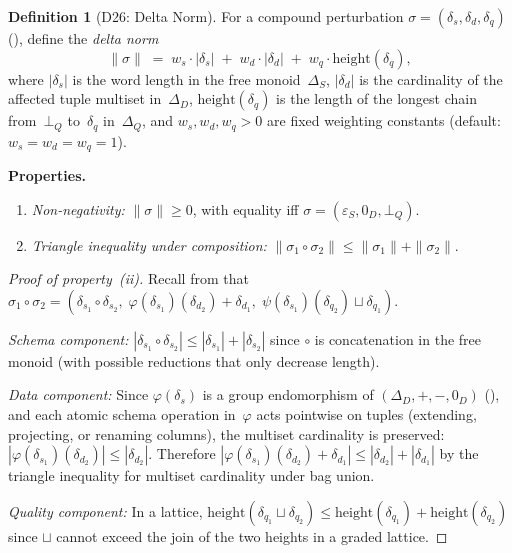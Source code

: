 \documentclass[11pt,a4paper]{article}
\theoremstyle{definition}
\newtheorem{definition}[theorem]{Definition}
\newcommand{\DeltaS}{\Delta_{\!S}}
\newcommand{\DeltaD}{\Delta_{\!D}}
\newcommand{\DeltaQ}{\Delta_{\!Q}}
\newcommand{\epsS}{\varepsilon_S}
\newcommand{\zeroD}{0_D}
\newcommand{\botQ}{\bot_Q}
\begin{document}
\begin{definition}[D26: Delta Norm]\label{def:delta-norm}
For a compound perturbation $\sigma = (\delta_s, \delta_d, \delta_q)$
(), define the \emph{delta norm}
\[
  \|\sigma\| \;=\; w_s \cdot |\delta_s| \;+\; w_d \cdot |\delta_d| \;+\;
                   w_q \cdot \mathrm{height}(\delta_q),
\]
where $|\delta_s|$ is the word length in the free monoid~$\DeltaS$,
$|\delta_d|$ is the cardinality of the affected tuple multiset in~$\DeltaD$,
$\mathrm{height}(\delta_q)$ is the length of the longest chain from~$\botQ$
to~$\delta_q$ in~$\DeltaQ$, and $w_s, w_d, w_q > 0$ are fixed weighting
constants (default: $w_s = w_d = w_q = 1$).

\medskip\noindent
\textbf{Properties.}
\begin{enumerate}[nosep,label=(\roman*)]
  \item \emph{Non-negativity:} $\|\sigma\| \geq 0$, with equality iff
    $\sigma = (\epsS, \zeroD, \botQ)$.
  \item \emph{Triangle inequality under composition:}
    $\|\sigma_1 \circ \sigma_2\| \leq \|\sigma_1\| + \|\sigma_2\|$.
\end{enumerate}
\end{definition}

\begin{proof}[Proof of property~(ii)]
Recall from  that
$\sigma_1 \circ \sigma_2 = (\delta_{s_1} \circ \delta_{s_2},\;
\varphi(\delta_{s_1})(\delta_{d_2}) + \delta_{d_1},\;
\psi(\delta_{s_1})(\delta_{q_2}) \sqcup \delta_{q_1})$.

\emph{Schema component:} $|\delta_{s_1} \circ \delta_{s_2}| \leq
|\delta_{s_1}| + |\delta_{s_2}|$ since $\circ$ is concatenation in the free
monoid (with possible reductions that only decrease length).

\emph{Data component:}  Since $\varphi(\delta_s)$ is a group endomorphism of
$(\DeltaD, +, -, \zeroD)$ (), and each atomic schema
operation in~$\varphi$ acts pointwise on tuples (extending, projecting, or
renaming columns), the multiset cardinality is preserved:
$|\varphi(\delta_{s_1})(\delta_{d_2})| \leq |\delta_{d_2}|$.  Therefore
$|\varphi(\delta_{s_1})(\delta_{d_2}) + \delta_{d_1}| \leq
|\delta_{d_2}| + |\delta_{d_1}|$ by the triangle inequality for multiset
cardinality under bag union.

\emph{Quality component:}  In a lattice,
$\mathrm{height}(\delta_{q_1} \sqcup \delta_{q_2}) \leq
\mathrm{height}(\delta_{q_1}) + \mathrm{height}(\delta_{q_2})$
since $\sqcup$ cannot exceed the join of the two heights in a graded lattice.
\end{proof}
\end{document}
